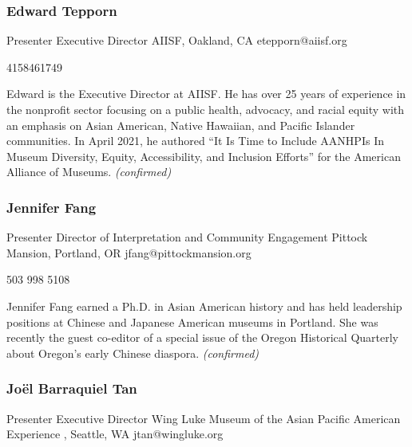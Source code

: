 \documentclass{report}
\begin{document}
              
                \subsubsection*{ Edward Tepporn }
                Presenter\newline
                Executive Director\newline
                AIISF, Oakland, CA
                \newline
                etepporn@aiisf.org\newline
                
                4158461749\newline

                Edward is the Executive Director at AIISF. He has over 25 years of experience in the nonprofit sector focusing on a public health, advocacy, and racial equity with an emphasis on Asian American, Native Hawaiian, and Pacific Islander communities. In April 2021, he authored “It Is Time to Include AANHPIs In Museum Diversity, Equity, Accessibility, and Inclusion Efforts” for the American Alliance of Museums.
                \emph{ (confirmed) }
              

              
                \subsubsection*{ Jennifer  Fang }
                Presenter\newline
                Director of Interpretation and Community Engagement\newline
                Pittock Mansion, Portland, OR
                \newline
                jfang@pittockmansion.org\newline
                
                503 998 5108\newline

                Jennifer Fang earned a Ph.D. in Asian American history and has held leadership positions at Chinese and Japanese American museums in Portland. She was recently the guest co-editor of a special issue of the Oregon Historical Quarterly about Oregon’s early Chinese diaspora.
                \emph{ (confirmed) }
              

              
                \subsubsection*{ Joël  Barraquiel Tan }
                Presenter\newline
                Executive Director\newline
                Wing Luke Museum of the Asian Pacific American Experience , Seattle, WA
                \newline
                jtan@wingluke.org\newline
                
\end{document}
